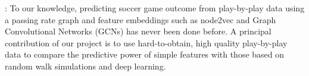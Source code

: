 
:
To our knowledge, predicting soccer game outcome from play-by-play data using a passing rate graph and feature embeddings such as node2vec and Graph Convolutional Networks (GCNs) has never been done before.
A principal contribution of our project is to use hard-to-obtain, high quality play-by-play data
to compare the predictive power of simple features with those based on random walk simulations and deep learning.


